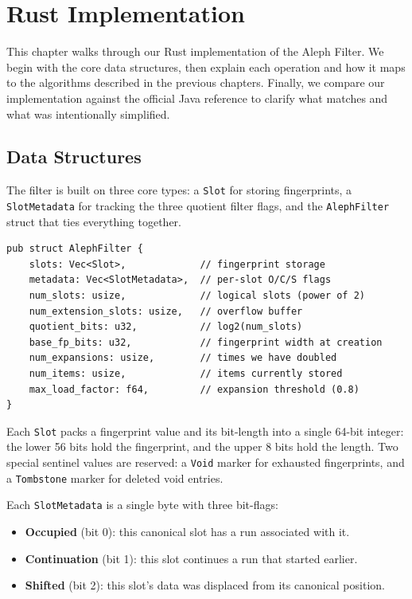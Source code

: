 \chapter{Rust Implementation}

This chapter walks through our Rust implementation of the Aleph Filter. We begin with the core data structures, then explain each operation and how it maps to the algorithms described in the previous chapters. Finally, we compare our implementation against the official Java reference to clarify what matches and what was intentionally simplified.

\section{Data Structures}

The filter is built on three core types: a \texttt{Slot} for storing fingerprints, a \texttt{SlotMetadata} for tracking the three quotient filter flags, and the \texttt{AlephFilter} struct that ties everything together.

\begin{lstlisting}[caption={The main AlephFilter struct}]
pub struct AlephFilter {
    slots: Vec<Slot>,             // fingerprint storage
    metadata: Vec<SlotMetadata>,  // per-slot O/C/S flags
    num_slots: usize,             // logical slots (power of 2)
    num_extension_slots: usize,   // overflow buffer
    quotient_bits: u32,           // log2(num_slots)
    base_fp_bits: u32,            // fingerprint width at creation
    num_expansions: usize,        // times we have doubled
    num_items: usize,             // items currently stored
    max_load_factor: f64,         // expansion threshold (0.8)
}
\end{lstlisting}

Each \texttt{Slot} packs a fingerprint value and its bit-length into a single 64-bit integer: the lower 56 bits hold the fingerprint, and the upper 8 bits hold the length. Two special sentinel values are reserved: a \texttt{Void} marker for exhausted fingerprints, and a \texttt{Tombstone} marker for deleted void entries.

Each \texttt{SlotMetadata} is a single byte with three bit-flags:
\begin{itemize}
    \item \textbf{Occupied} (bit 0): this canonical slot has a run associated with it.
    \item \textbf{Continuation} (bit 1): this slot continues a run that started earlier.
    \item \textbf{Shifted} (bit 2): this slot's data was displaced from its canonical position.
\end{itemize}


